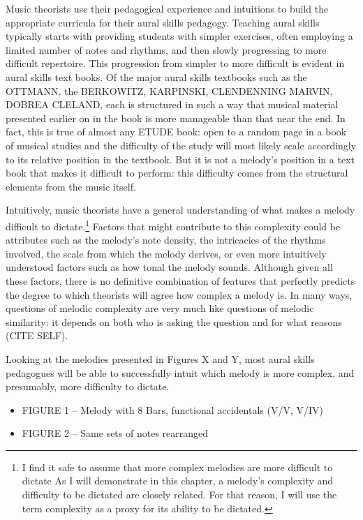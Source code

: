 \documentclass[]{book}
\let\rmarkdownfootnote\footnote%
\def\footnote{\protect\rmarkdownfootnote}
\begin{document}
Music theorists use their pedagogical experience and intuitions to build the appropriate curricula for their aural skills pedagogy.
Teaching aural skills typically starts with providing students with simpler exercises, often employing a limited number of notes and rhythms, and then slowly progressing to more difficult repertoire.
This progression from simpler to more difficult is evident in aural skills text books.
Of the major aural skills textbooks such as the OTTMANN, the BERKOWITZ, KARPINSKI, CLENDENNING MARVIN, DOBREA CLELAND, each is structured in such a way that musical material presented earlier on in the book is more manageable than that near the end.
In fact, this is true of almost any ETUDE book: open to a random page in a book of musical studies and the difficulty of the study will most likely scale accordingly to its relative position in the textbook.
But it is not a melody's position in a text book that makes it difficult to perform: this difficulty comes from the structural elements from the music itself.

Intuitively, music theorists have a general understanding of what makes a melody difficult to dictate.\footnote{I find it safe to assume that more complex melodies are more difficult to dictate As I will demonstrate in this chapter, a melody's complexity and difficulty to be dictated are closely related. For that reason, I will use the term complexity as a proxy for its ability to be dictated.}
Factors that might contribute to this complexity could be attributes such as the melody's note density, the intricacies of the rhythms involved, the scale from which the melody derives, or even more intuitively understood factors such as how tonal the melody sounds.
Although given all these factors, there is no definitive combination of features that perfectly predicts the degree to which theorists will agree how complex a melody is.
In many ways, questions of melodic complexity are very much like questions of melodic similarity: it depends on both who is asking the question and for what reasons (CITE SELF).

Looking at the melodies presented in Figures X and Y, most aural skills pedagogues will be able to successfully intuit which melody is more complex, and presumably, more difficulty to dictate.

\begin{itemize}
\item
  FIGURE 1 -- Melody with 8 Bars, functional accidentals (V/V, V/IV)
\item
  FIGURE 2 -- Same sets of notes rearranged
\end{itemize}
\end{document}
